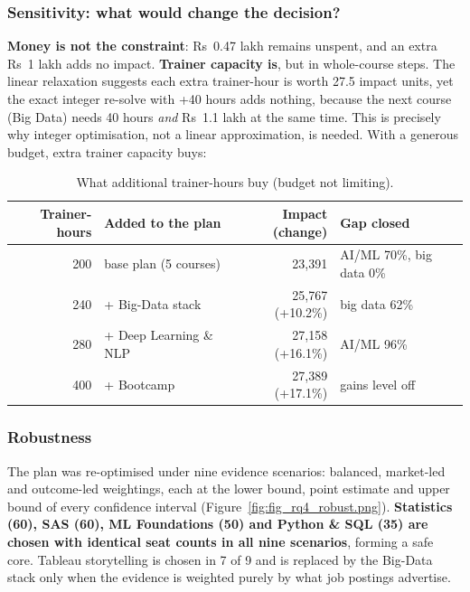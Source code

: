 \subsubsection{Sensitivity: what would change the decision?}

\textbf{Money is not the constraint}: Rs~0.47 lakh remains unspent, and an extra Rs~1 lakh adds no
impact. \textbf{Trainer capacity is}, but in whole-course steps. The linear relaxation suggests each
extra trainer-hour is worth 27.5 impact units, yet the exact integer re-solve with +40 hours adds
nothing, because the next course (Big Data) needs 40 hours \emph{and} Rs~1.1 lakh at the same time.
This is precisely why integer optimisation, not a linear approximation, is needed. With a generous
budget, extra trainer capacity buys:

\begin{table}[H]\centering\small
\caption{What additional trainer-hours buy (budget not limiting).}\label{tab:hours}
\begin{tabular}{@{}r l r l@{}}
\toprule
Trainer-hours & Added to the plan & Impact (change) & Gap closed\\
\midrule
200 & base plan (5 courses) & 23,391 & AI/ML 70\%, big data 0\%\\
240 & + Big-Data stack & 25,767 (+10.2\%) & big data 62\%\\
280 & + Deep Learning \& NLP & 27,158 (+16.1\%) & AI/ML 96\%\\
400 & + Bootcamp & 27,389 (+17.1\%) & gains level off\\
\bottomrule
\end{tabular}
\end{table}


\subsubsection{Robustness}

The plan was re-optimised under nine evidence scenarios: balanced, market-led and outcome-led
weightings, each at the lower bound, point estimate and upper bound of every confidence interval
(Figure~\ref{fig:fig_rq4_robust.png}). \textbf{Statistics (60), SAS (60), ML Foundations (50) and
Python \& SQL (35) are chosen with identical seat counts in all nine scenarios}, forming a safe core.
Tableau storytelling is chosen in 7 of 9 and is replaced by the Big-Data stack only when the
evidence is weighted purely by what job postings advertise.

